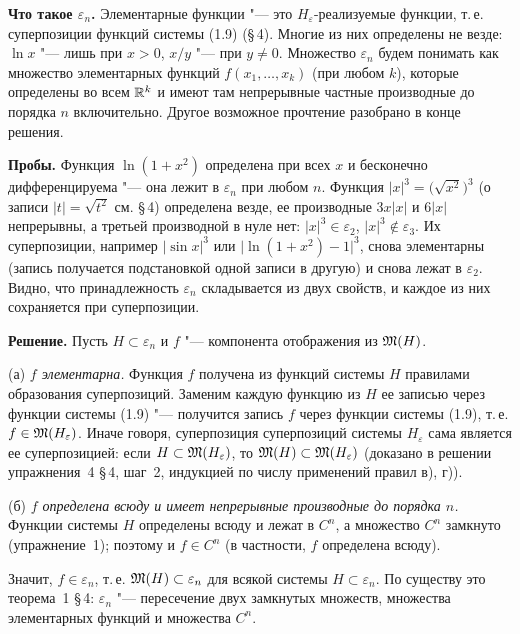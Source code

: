 \begin{solution}[3 (\S\,5)]
\textbf{Что такое $\varepsilon_n$.} Элементарные функции "---
это $H_\varepsilon$-реализуемые функции, т.\,е. суперпозиции функций системы
(1.9) (\S\,4). Многие из них определены не везде: $\ln x$ "--- лишь при $x>0$,
$x/y$ "--- при $y\ne0$. Множество $\varepsilon_n$ будем понимать как множество
элементарных функций $f(x_1,\dots,x_k)$ (при любом $k$), которые определены
во всем $\mathbb R^k$ и имеют там непрерывные частные производные до порядка $n$
включительно. Другое возможное прочтение разобрано в конце решения.

\textbf{Пробы.} Функция $\ln(1+x^2)$ определена при всех $x$ и бесконечно
дифференцируема "--- она лежит в $\varepsilon_n$ при любом $n$. Функция
$|x|^3=\bigl(\sqrt{x^2}\bigr)^3$ (о записи $|t|=\sqrt{t^2}$ см. \S\,4)
определена везде, ее производные $3x|x|$ и $6|x|$ непрерывны, а третьей
производной в нуле нет: $|x|^3\in\varepsilon_2$, $|x|^3\notin\varepsilon_3$.
Их суперпозиции, например $|\sin x|^3$ или $\bigl|\ln(1+x^2)-1\bigr|^3$,
снова элементарны (запись получается подстановкой одной записи в другую)
и снова лежат в $\varepsilon_2$. Видно, что принадлежность $\varepsilon_n$
складывается из двух свойств, и каждое из них сохраняется при суперпозиции.

\textbf{Решение.} Пусть $H\subset\varepsilon_n$ и $f$ "--- компонента
отображения из $\mathfrak M(H)$.

(а) \emph{$f$ элементарна.} Функция $f$ получена из функций системы $H$
правилами образования суперпозиций. Заменим каждую функцию из $H$ ее записью
через функции системы (1.9) "--- получится запись $f$ через функции системы
(1.9), т.\,е. $f\in\mathfrak M(H_\varepsilon)$. Иначе говоря, суперпозиция суперпозиций
системы $H_\varepsilon$ сама является ее суперпозицией: если
$H\subset\mathfrak M(H_\varepsilon)$, то $\mathfrak M(H)\subset\mathfrak M(H_\varepsilon)$ (доказано
в решении упражнения~4 \S\,4, шаг~2, индукцией по числу применений правил
в), г)).

(б) \emph{$f$ определена всюду и имеет непрерывные производные до порядка
$n$.} Функции системы $H$ определены всюду и лежат в $C^n$, а множество
$C^n$ замкнуто (упражнение~1); поэтому и $f\in C^n$ (в частности, $f$
определена всюду).

Значит, $f\in\varepsilon_n$, т.\,е. $\mathfrak M(H)\subset\varepsilon_n$ для всякой
системы $H\subset\varepsilon_n$. По существу это теорема~1 \S\,4:
$\varepsilon_n$ "--- пересечение двух замкнутых множеств, множества
элементарных функций и множества $C^n$.


\end{solution}
